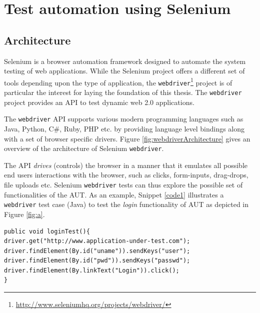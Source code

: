 \section{Test automation using Selenium}
\label{sec:SeleniumTesting}
\subsection{Architecture}
\label{ssec:webdriverArchitecture}
Selenium is a browser automation framework designed to automate the system testing of web applications. While the Selenium project offers a different set of tools depending upon the type of application, the  \texttt{webdriver}\footnote{\url{http://www.seleniumhq.org/projects/webdriver/}} project is of particular the interest for laying the foundation of this thesis. The \texttt{webdriver} project provides an API to test dynamic web 2.0 applications. 

The \texttt{webdriver} API supports various modern programming languages such as Java, Python, C\#, Ruby, PHP etc. by providing language level bindings along with a set of browser specific drivers. Figure \ref{fig:webdriverArchitecture} gives an overview of the architecture of Selenium \texttt{webdriver}.

The API \textit{drives} (controls) the browser in a manner that it emulates all possible end users interactions with the browser, such as clicks, form-inputs, drag-drops, file uploads etc. Selenium \texttt{webdriver} tests can thus explore the possible set of functionalities of the AUT. As an example, Snippet \ref{code1} illustrates a \texttt{webdriver} test case (Java) to test the \textit{login} functionality of AUT as depicted in Figure \ref{fig:a}.
\begin{center}
\begin{scriptsize}
\centering
\lstset{
  basicstyle=\ttfamily,
  columns=fullflexible,
  keepspaces=true,
}
  
\begin{lstlisting}[caption=Login test,label=code1]
public void loginTest(){
driver.get("http://www.application-under-test.com");
driver.findElement(By.id("uname")).sendKeys("user");
driver.findElement(By.id("pwd")).sendKeys("passwd");
driver.findElement(By.linkText("Login")).click();
}
\end{lstlisting}
\end{scriptsize} 
\end{center}
 
